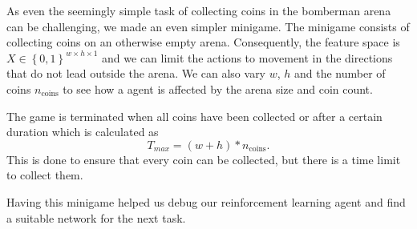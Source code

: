 
\label{ch:minigame}
As even the seemingly simple task of collecting coins in the bomberman arena can be challenging, we made an even simpler minigame. The minigame consists of collecting coins on an otherwise empty arena. Consequently, the feature space is $X\in\left\{0,1\right\}^{w\times h \times 1}$ and we can limit the actions to movement in the directions that do not lead outside the arena. We can also vary $w$, $h$ and the number of coins $n_{\text{coins}}$ to see how a agent is affected by the arena size and coin count.

The game is terminated when all coins have been collected or after a certain duration which is calculated as $$T_{max}=(w+h)*n_{\text{coins}}.$$
This is done to ensure that every coin can be collected, but there is a time limit to collect them.

Having this minigame helped us debug our reinforcement learning agent and find a suitable network for the next task.
